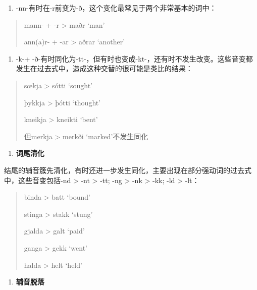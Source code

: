 \begin{enumerate}
\def\labelenumi{(\alph{enumi})}
\setcounter{enumi}{3}
\item
  -nn-有时在-r前变为-ð，这个变化最常见于两个非常基本的词中：
\end{enumerate}

\begin{quote}
mann- + -r \textgreater{} maðr `man'

ann(a)r- + -ar \textgreater{} aðrar `another'
\end{quote}

\begin{enumerate}
\def\labelenumi{(\alph{enumi})}
\setcounter{enumi}{4}
\item
  -k-+
  -ð-有时同化为-tt-，但有时也变成-kt-，还有时不发生改变。这些音变都发生在过去式中，造成这种交替的很可能是类比的结果：
\end{enumerate}

\begin{quote}
sœkja \textgreater{} sótti `sought'

þykkja \textgreater{} þótti `thought'

kneikja \textgreater{} kneikti `bent'

但merkja \textgreater{} merkði `marked'不发生同化
\end{quote}

\begin{enumerate}
\def\labelenumi{\Alph{enumi}.}
\setcounter{enumi}{1}
\item
  \textbf{词尾清化}
\end{enumerate}

结尾的辅音簇先清化，有时还进一步发生同化，主要出现在部分强动词的过去式中，这些音变包括-nd
\textgreater{} -nt \textgreater{} -tt; -ng \textgreater{} -nk
\textgreater{} -kk; -ld \textgreater{} -lt：

\begin{quote}
binda \textgreater{} batt `bound'

stinga \textgreater{} stakk `stung'

gjalda \textgreater{} galt `paid'

ganga \textgreater{} gekk `went'

halda \textgreater{} helt `held'
\end{quote}

\begin{enumerate}
\def\labelenumi{\Alph{enumi}.}
\setcounter{enumi}{2}
\item
  \textbf{辅音脱落}
\end{enumerate}

